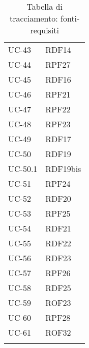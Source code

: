 \begin{longtable}{| p{5cm} | p{5cm} |}
		UC-43 & RDF14\\
		UC-44 & RPF27\\
		\rowcolor{LightGray}
		UC-45 & RDF16\\
		UC-46 & RPF21\\
		\rowcolor{LightGray}
		UC-47 & RPF22\\
		UC-48 & RPF23\\
		\rowcolor{LightGray}
		UC-49 & RDF17 \\
		UC-50 & RDF19 \\
		UC-50.1 & RDF19bis \\
		\rowcolor{LightGray}
		UC-51 & RPF24 \\
		UC-52 & RDF20 \\
		\rowcolor{LightGray}
		UC-53 & RPF25 \\
		UC-54 & RDF21 \\
		\rowcolor{LightGray}
		UC-55 & RDF22 \\
		UC-56 & RDF23 \\
		\rowcolor{LightGray}
		UC-57 & RPF26 \\
		UC-58 & RDF25\\
		\rowcolor{LightGray}
		UC-59 & ROF23\\
		UC-60 & RPF28\\
		\rowcolor{LightGray}
		UC-61 & ROF32\\
		\hline
		\caption{Tabella di tracciamento: fonti-requisiti}
\end{longtable}
\newpage
